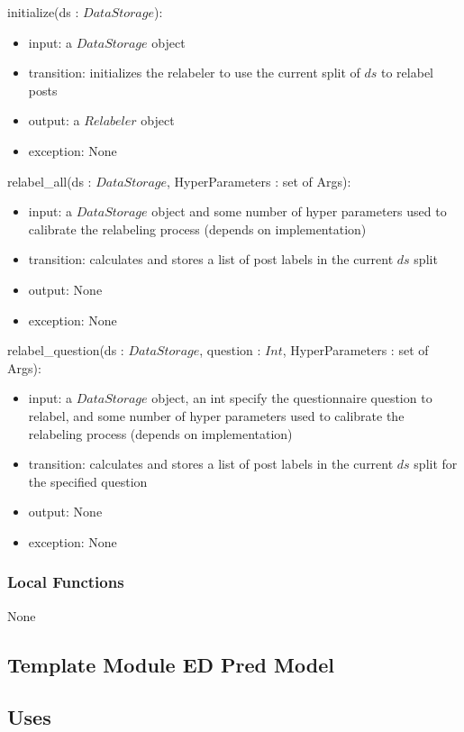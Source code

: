 \documentclass[12pt, titlepage]{article}
\begin{document}
\noindent initialize(ds : $DataStorage$):
\begin{itemize}
\item input: a $DataStorage$ object
\item transition: initializes the relabeler to use the current split of $ds$ to relabel posts
\item output: a $Relabeler$ object
\item exception: None
\end{itemize}

\noindent relabel\_all(ds : $DataStorage$, HyperParameters : set of Args):
\begin{itemize}
\item input: a $DataStorage$ object and some number of hyper parameters used to calibrate the relabeling process (depends on implementation)
\item transition: calculates and stores a list of post labels in the current $ds$ split
\item output: None
\item exception: None
\end{itemize}

\noindent relabel\_question(ds : $DataStorage$, question : $Int$, HyperParameters : set of Args):
\begin{itemize}
\item input: a $DataStorage$ object, an int specify the questionnaire question to relabel, and some number of hyper parameters used to calibrate the relabeling process (depends on implementation)
\item transition: calculates and stores a list of post labels in the current $ds$ split for the specified question
\item output: None
\item exception: None
\end{itemize}

\subsubsection{Local Functions}

None


\subsection{Template Module ED Pred Model}

\subsection{Uses}
\end{document}
